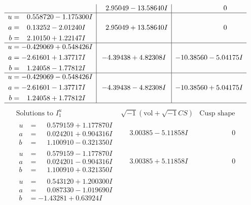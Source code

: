 \documentclass[1p]{elsarticle_modified}
\theoremstyle{definition}
\newcommand{\I}{\sqrt{-1}}
\begin{document}
$$\begin{array}{c|c|c}
 & \phantom{-}2.95049 - 13.58640 I & \phantom{-0.000000 } 0 \\ \hline\begin{aligned}
u &= \phantom{-}0.558720 - 1.175300 I \\
a &= \phantom{-}0.13252 - 2.01240 I \\
b &= \phantom{-}2.10150 + 1.22147 I\end{aligned}
 & \phantom{-}2.95049 + 13.58640 I & \phantom{-0.000000 } 0 \\ \hline\begin{aligned}
u &= -0.429069 + 0.548426 I \\
a &= -2.61601 + 1.37717 I \\
b &= \phantom{-}1.24058 - 1.77812 I\end{aligned}
 & -4.39438 + 4.82308 I & -10.38560 - 5.04175 I \\ \hline\begin{aligned}
u &= -0.429069 - 0.548426 I \\
a &= -2.61601 - 1.37717 I \\
b &= \phantom{-}1.24058 + 1.77812 I\end{aligned}
 & -4.39438 - 4.82308 I & -10.38560 + 5.04175 I\\
 \hline 
 \end{array}$$\newpage$$\begin{array}{c|c|c}  
\text{Solutions to }I^u_{1}& \I (\text{vol} + \sqrt{-1}CS) & \text{Cusp shape}\\
 \hline 
\begin{aligned}
u &= \phantom{-}0.579159 + 1.177870 I \\
a &= \phantom{-}0.024201 + 0.904316 I \\
b &= \phantom{-}1.100910 - 0.321350 I\end{aligned}
 & \phantom{-}3.00385 - 5.11858 I & \phantom{-0.000000 } 0 \\ \hline\begin{aligned}
u &= \phantom{-}0.579159 - 1.177870 I \\
a &= \phantom{-}0.024201 - 0.904316 I \\
b &= \phantom{-}1.100910 + 0.321350 I\end{aligned}
 & \phantom{-}3.00385 + 5.11858 I & \phantom{-0.000000 } 0 \\ \hline\begin{aligned}
u &= \phantom{-}0.543120 + 1.200300 I \\
a &= \phantom{-}0.087330 - 1.019690 I \\
b &= -1.43281 + 0.63924 I\end{aligned}

\end{array}$$
\end{document}
